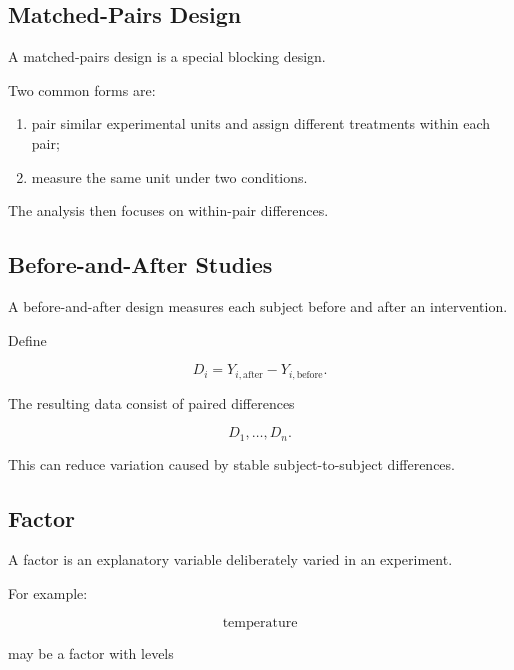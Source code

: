 \subsection{Matched-Pairs Design}
\label{subsec:matched-pairs-design}

A matched-pairs design is a special blocking design.

Two common forms are:

\begin{enumerate}
    \item pair similar experimental units and assign different treatments
          within each pair;
    \item measure the same unit under two conditions.
\end{enumerate}

The analysis then focuses on within-pair differences.

\subsection{Before-and-After Studies}
\label{subsec:before-after-studies}

A before-and-after design measures each subject before and after an
intervention.

Define

\[
\boxed{
D_i
=
Y_{i,\text{after}}
-
Y_{i,\text{before}}.
}
\]

The resulting data consist of paired differences

\[
D_1,\ldots,D_n.
\]

This can reduce variation caused by stable subject-to-subject
differences.

\subsection{Factor}
\label{subsec:factor-experiment}

A factor is an explanatory variable deliberately varied in an
experiment.

For example:

\[
\text{temperature}
\]

may be a factor with levels

